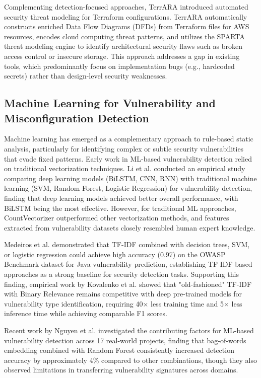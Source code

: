 Complementing detection-focused approaches, TerrARA \cite{Chowdhury24} introduced automated security threat modeling for Terraform configurations. TerrARA automatically constructs enriched Data Flow Diagrams (DFDs) from Terraform files for AWS resources, encodes cloud computing threat patterns, and utilizes the SPARTA threat modeling engine to identify architectural security flaws such as broken access control or insecure storage. This approach addresses a gap in existing tools, which predominantly focus on implementation bugs (e.g., hardcoded secrets) rather than design-level security weaknesses.

\subsection{Machine Learning for Vulnerability and Misconfiguration Detection}

Machine learning has emerged as a complementary approach to rule-based static analysis, particularly for identifying complex or subtle security vulnerabilities that evade fixed patterns. Early work in ML-based vulnerability detection relied on traditional vectorization techniques. Li et al. \cite{Li20} conducted an empirical study comparing deep learning models (BiLSTM, CNN, RNN) with traditional machine learning (SVM, Random Forest, Logistic Regression) for vulnerability detection, finding that deep learning models achieved better overall performance, with BiLSTM being the most effective. However, for traditional ML approaches, CountVectorizer outperformed other vectorization methods, and features extracted from vulnerability datasets closely resembled human expert knowledge.

Medeiros et al. \cite{Medeiros20} demonstrated that TF-IDF combined with decision trees, SVM, or logistic regression could achieve high accuracy (0.97) on the OWASP Benchmark dataset for Java vulnerability prediction, establishing TF-IDF-based approaches as a strong baseline for security detection tasks. Supporting this finding, empirical work by Kovalenko et al. \cite{Kovalenko23} showed that "old-fashioned" TF-IDF with Binary Relevance remains competitive with deep pre-trained models for vulnerability type identification, requiring 40× less training time and 5× less inference time while achieving comparable F1 scores.

Recent work by Nguyen et al. \cite{Nguyen24} investigated the contributing factors for ML-based vulnerability detection across 17 real-world projects, finding that bag-of-words embedding combined with Random Forest consistently increased detection accuracy by approximately 4\% compared to other combinations, though they also observed limitations in transferring vulnerability signatures across domains.

